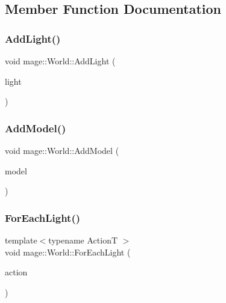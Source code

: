 \subsection{Member Function Documentation}
\hypertarget{classmage_1_1_world_ab0c31d3113ea264fed8b8ef034047c91}{}\label{classmage_1_1_world_ab0c31d3113ea264fed8b8ef034047c91} 
\subsubsection{\texorpdfstring{Add\+Light()}{AddLight()}}
{\footnotesize\ttfamily void mage\+::\+World\+::\+Add\+Light (\begin{DoxyParamCaption}\item[{\hyperlink{namespacemage_a1e01ae66713838a7a67d30e44c67703e}{Shared\+Ptr}$<$ \hyperlink{classmage_1_1_point_light}{Point\+Light} $>$}]{light }\end{DoxyParamCaption})}

\hypertarget{classmage_1_1_world_a4b7287a11ff316b029ec7727ed0d076d}{}\label{classmage_1_1_world_a4b7287a11ff316b029ec7727ed0d076d} 
\subsubsection{\texorpdfstring{Add\+Model()}{AddModel()}}
{\footnotesize\ttfamily void mage\+::\+World\+::\+Add\+Model (\begin{DoxyParamCaption}\item[{\hyperlink{namespacemage_a1e01ae66713838a7a67d30e44c67703e}{Shared\+Ptr}$<$ \hyperlink{classmage_1_1_model}{Model} $>$}]{model }\end{DoxyParamCaption})}

\hypertarget{classmage_1_1_world_a4a95952713a717c9677dc9dd4dc82780}{}\label{classmage_1_1_world_a4a95952713a717c9677dc9dd4dc82780} 
\subsubsection{\texorpdfstring{For\+Each\+Light()}{ForEachLight()}\hspace{0.1cm}{\footnotesize\ttfamily [1/2]}}
{\footnotesize\ttfamily template$<$typename ActionT $>$ \\
void mage\+::\+World\+::\+For\+Each\+Light (\begin{DoxyParamCaption}\item[{ActionT}]{action }\end{DoxyParamCaption})}

